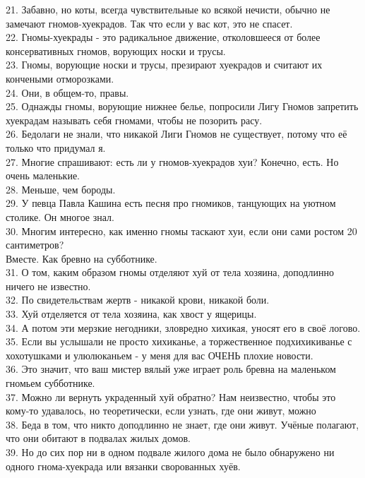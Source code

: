 \documentclass[a4paper,20pt,notitlepage]{extbook}
\begin{document}
	21. Забавно, но коты, всегда чувствительные ко всякой нечисти, обычно не замечают гномов-хуекрадов. Так что если у вас кот, это не спасет.\\
	22. Гномы-хуекрады - это радикальное движение, отколовшееся от более консервативных гномов, ворующих носки и трусы.\\
	23. Гномы, ворующие носки и трусы, презирают хуекрадов и считают их кончеными отморозками.\\
	24. Они, в общем-то, правы.\\
	25. Однажды гномы, ворующие нижнее белье, попросили Лигу Гномов запретить хуекрадам называть себя гномами, чтобы не позорить расу.\\
	26. Бедолаги не знали, что никакой Лиги Гномов не существует, потому что её только что придумал я.\\
	27. Многие спрашивают: есть ли у гномов-хуекрадов хуи? Конечно, есть. Но очень маленькие.\\
	28. Меньше, чем бороды.\\
	29. У певца Павла Кашина есть песня про гномиков, танцующих на уютном столике. Он многое знал.\\
	30. Многим интересно, как именно гномы таскают хуи, если они сами ростом 20 сантиметров?\\
	Вместе. Как бревно на субботнике.\\
	31. О том, каким образом гномы отделяют хуй от тела хозяина, доподлинно ничего не известно.\\
	32. По свидетельствам жертв - никакой крови, никакой боли.\\
	33. Хуй отделяется от тела хозяина, как хвост у ящерицы.\\
	34. А потом эти мерзкие негодники, зловредно хихикая, уносят его в своё логово.\\
	35. Если вы услышали не просто хихиканье, а торжественное подхихикиванье с хохотушками и улюлюканьем - у меня для вас ОЧЕНЬ плохие новости.\\
	36. Это значит, что ваш мистер вялый уже играет роль бревна на маленьком гномьем субботнике.\\
	37. Можно ли вернуть украденный хуй обратно? Нам неизвестно, чтобы это кому-то удавалось, но теоретически, если узнать, где они живут, можно\\
	38. Беда в том, что никто доподлинно не знает, где они живут. Учёные полагают, что они обитают в подвалах жилых домов.\\
	39. Но до сих пор ни в одном подвале жилого дома не было обнаружено ни одного гнома-хуекрада или вязанки сворованных хуёв.\\
\end{document}
